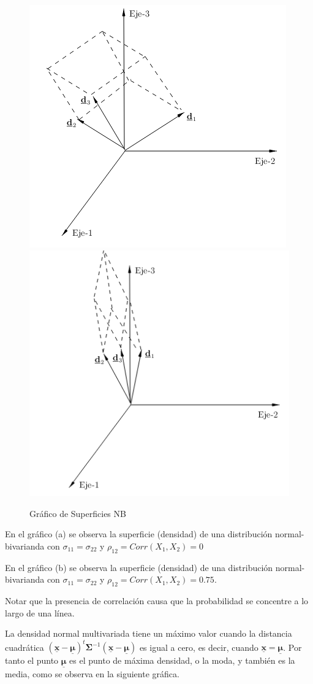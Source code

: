 \documentclass[
]{book}
\theoremstyle{definition}
\theoremstyle{definition}
\theoremstyle{definition}
\theoremstyle{definition}
\theoremstyle{remark}
\begin{document}
\begin{figure}

{\centering \includegraphics[width=0.5\linewidth]{imagenes/graf7} \includegraphics[width=0.5\linewidth]{imagenes/graf8} 

}

\caption{Gráfico de Superficies NB}\label{fig:superficies-NB}
\end{figure}

En el gráfico (a) se observa la superficie (densidad) de una distribución normal-bivarianda con \(\sigma_{11}=\sigma_{22}\) y \(\rho_{12}=Corr(X_1,X_2)=0\)

En el gráfico (b) se observa la superficie (densidad) de una distribución normal-bivarianda con \(\sigma_{11}=\sigma_{22}\) y \(\rho_{12}=Corr(X_1,X_2)=0.75\).

Notar que la presencia de correlación causa que la probabilidad se concentre a lo largo de una línea.

La densidad normal multivariada tiene un máximo valor cuando la distancia cuadrática \((\underline{\mathbf{x}}-\underline{\mathbf{\mu}})^t\mathbf{\Sigma}^{-1}(\underline{\mathbf{x}}-\underline{\mathbf{\mu}})\) es igual a cero, es
decir, cuando \(\underline{\mathbf{x}}=\underline{\mathbf{\mu}}\). Por tanto el punto \(\underline{\mathbf{\mu}}\) es el punto de máxima densidad, o la moda, y también es la media, como se observa en la siguiente gráfica.
\end{document}
